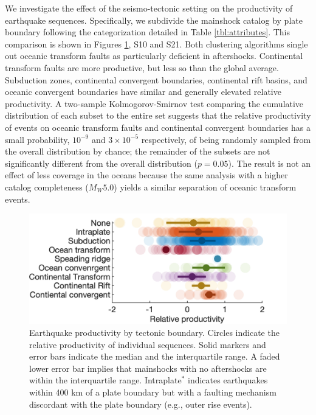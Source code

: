 \documentclass[draft, jgrga]{agujournal2018}
\begin{document}
    We investigate the effect of the seismo-tectonic setting on the productivity of earthquake sequences. Specifically, we subdivide the mainshock catalog by plate boundary following the categorization detailed in Table \ref{tbl:attributes}. This comparison is shown in Figures \ref{fig:plate_boundary}, S10 and S21. Both clustering algorithms single out oceanic transform faults as particularly deficient in aftershocks. Continental transform faults are more productive, but less so than the global average. Subduction zones, continental convergent boundaries, continental rift basins, and oceanic convergent boundaries have similar and generally elevated relative productivity. A two-sample Kolmogorov-Smirnov test comparing the cumulative distribution of each subset to the entire set suggests that the relative productivity of events on oceanic transform faults and continental convergent boundaries has a small probability, $10^{-9}$ and $3\times10^{-5}$ respectively, of being randomly sampled from the overall distribution by chance; the remainder of the subsets are not significantly different from the overall distribution ($p = 0.05$). The result is not an effect of less coverage in the oceans because the same analysis with a higher catalog completeness ($M_W5.0$) yields a similar separation of oceanic transform events.

    \begin{figure}
        \centering
        \includegraphics{prod_by_pb.png}
        \caption{Earthquake productivity by tectonic boundary. Circles indicate the relative productivity of individual sequences. Solid markers and error bars indicate the median and the interquartile range. A faded lower error bar implies that mainshocks with no aftershocks are within the interquartile range. Intraplate$^*$ indicates earthquakes within 400 km of a plate boundary but with a faulting mechanism discordant with the plate boundary (e.g., outer rise events).}
        \label{fig:plate_boundary}
    \end{figure}
\end{document}

